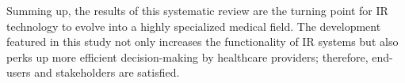 \documentclass[conference]{IEEEtran}
\begin{document}
Summing up, the results of this systematic review are the turning point for IR technology to evolve into a highly specialized medical field. The development featured in this study not only increases the functionality of IR systems but also perks up more efficient decision-making by healthcare providers; therefore, end-users and stakeholders are satisfied.


\end{document}
